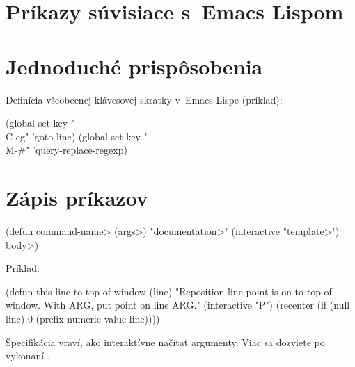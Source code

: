 \section{Príkazy súvisiace s~Emacs Lispom}


\section{Jednoduché prispôsobenia}



Definícia všeobecnej klávesovej skratky v~Emacs Lispe (príklad):

\beginexample%
(global-set-key "\\C-cg" 'goto-line)
(global-set-key "\\M-\#" 'query-replace-regexp)
\endexample

\section{Zápis príkazov}

\beginexample%
(defun \<command-name> (\<args>)
  "\<documentation>" (interactive "\<template>")
  \<body>)
\endexample

Príklad:

\beginexample%
(defun this-line-to-top-of-window (line)
  "Reposition line point is on to top of window.
With ARG, put point on line ARG."
  (interactive "P")
  (recenter (if (null line)
                0
              (prefix-numeric-value line))))
\endexample

Špecifikácia  vraví, ako interaktívne načítať ar\-gu\-men\-ty.
Viac sa dozviete po vykonaní .

\copyrightnotice

\bye

